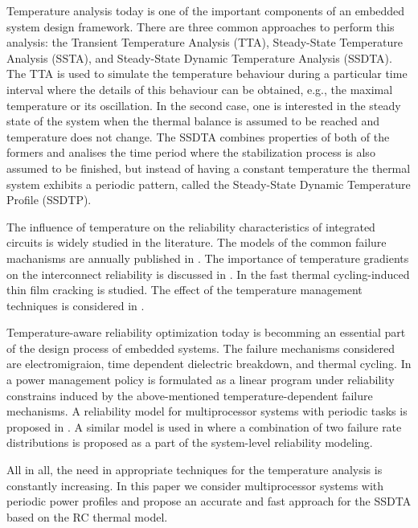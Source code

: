 Temperature analysis today is one of the important components of an embedded system design framework. There are three common approaches to perform this analysis: the Transient Temperature Analysis (TTA), Steady-State Temperature Analysis (SSTA), and Steady-State Dynamic Temperature Analysis (SSDTA). The TTA is used to simulate the temperature behaviour during a particular time interval where the details of this behaviour can be obtained, e.g., the maximal temperature or its oscillation. In the second case, one is interested in the steady state of the system when the thermal balance is assumed to be reached and temperature does not change. The SSDTA combines properties of both of the formers and analises the time period where the stabilization process is also assumed to be finished, but instead of having a constant temperature the thermal system exhibits a periodic pattern, called the Steady-State Dynamic Temperature Profile (SSDTP).



The influence of temperature on the reliability characteristics of integrated circuits is widely studied in the literature. The models of the common failure machanisms are annually published in \cite{jedec2010}. The importance of temperature gradients on the interconnect reliability is discussed in \cite{lu2004}. In \cite{hieu2004} the fast thermal cycling-induced thin film cracking is studied. The effect of the temperature management techniques is considered in \cite{srinivasan2003}.

Temperature-aware reliability optimization today is becomming an essential part of the design process of embedded systems. The failure mechanisms considered are electromigraion, time dependent dielectric breakdown, and thermal cycling. In \cite{coskun2006} a power management policy is formulated as a linear program under reliability constrains induced by the above-mentioned temperature-dependent failure mechanisms. A reliability model for multiprocessor systems with periodic tasks is proposed in \cite{huang2009}. A similar model is used in \cite{xiang2010} where a combination of two failure rate distributions is proposed as a part of the system-level reliability modeling.

All in all, the need in appropriate techniques for the temperature analysis is constantly increasing. In this paper we consider multiprocessor systems with periodic power profiles and propose an accurate and fast approach for the SSDTA based on the RC thermal model.

